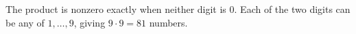 The product is nonzero exactly when neither digit is $0$. Each of the two digits can be any of $1,\dots,9$, giving $9\cdot9=\boxed{81}$ numbers.
